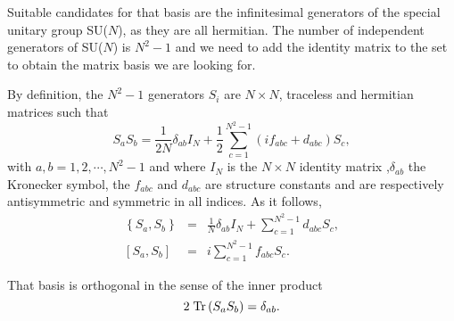 Suitable candidates for that basis are the infinitesimal generators of the special unitary group SU($N$), as they are all hermitian. The number of independent generators of SU($N$) is $N^2-1$ and we need to add the identity matrix to the set to obtain the matrix basis we are looking for.

By definition, the $N^2-1$ generators $S_i$ are $N\times N$, traceless and hermitian matrices such that
\[ S_a S_b = \frac{1}{2N}\delta_{ab}I_N + \frac{1}{2}\sum_{c=1}^{N^2 -1}{(if_{abc} + d_{abc}) S_c},  \]
with $a,b=1,2,\cdots, N^2-1$ and where $I_N$ is the $N\times N$ identity matrix ,$\delta_{ab}$ the Kronecker symbol, the $f_{abc} $ and $d_{abc}$ are structure constants and are respectively antisymmetric and symmetric in all indices. As it follows,
\begin{eqnarray}
\left\{S_a, S_b\right\} &=&\frac{1}{N}\delta_{ab} I_N+ \sum_{c=1}^{N^2 -1}{d_{abc} S_c}, \\
\left[S_a, S_b \right] &=& i \sum_{c=1}^{N^2 -1}{f_{abc} S_c}. \label{eq-Scomm}
\end{eqnarray}

That basis is orthogonal in the sense of the inner product
\[ 2\; \mbox{\textup{Tr}}\left( S_a S_b \right) =  \delta_{ab}. \]

